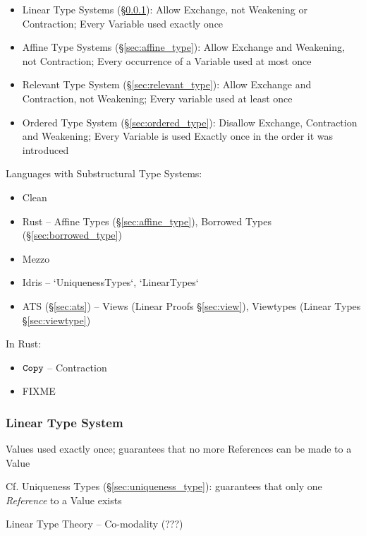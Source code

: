 \begin{itemize}
  \item Linear Type Systems (\S\ref{sec:linear_type}): Allow Exchange,
    not Weakening or Contraction; Every Variable used exactly once
  \item Affine Type Systems (\S\ref{sec:affine_type}): Allow Exchange
    and Weakening, not Contraction; Every occurrence of a Variable
    used at most once
  \item Relevant Type System (\S\ref{sec:relevant_type}): Allow
    Exchange and Contraction, not Weakening; Every variable used at
    least once
  \item Ordered Type System (\S\ref{sec:ordered_type}): Disallow
    Exchange, Contraction and Weakening; Every Variable is used
    Exactly once in the order it was introduced
\end{itemize}

Languages with Substructural Type Systems:

\begin{itemize}
  \item Clean
  \item Rust -- Affine Types (\S\ref{sec:affine_type}), Borrowed
    Types (\S\ref{sec:borrowed_type})
  \item Mezzo
  \item Idris -- `UniquenessTypes`, `LinearTypes`
  \item ATS (\S\ref{sec:ats}) -- Views (Linear Proofs
    \S\ref{sec:view}), Viewtypes (Linear Types \S\ref{sec:viewtype})
\end{itemize}

In Rust:

\begin{itemize}
  \item $\mathtt{Copy}$ -- Contraction
  \item FIXME
\end{itemize}



\subsubsection{Linear Type System}\label{sec:linear_type}

Values used exactly once; guarantees that no more References can be
made to a Value

\fist Cf. Uniqueness Types (\S\ref{sec:uniqueness_type}): guarantees
that only one \emph{Reference} to a Value exists

Linear Type Theory -- Co-modality (???) %

